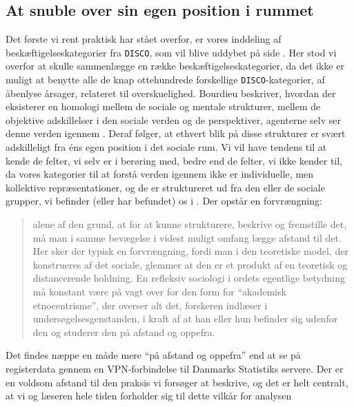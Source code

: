 \subsection{At snuble over sin egen position i rummet}

Det første vi rent praktisk har stået overfor, er vores inddeling af beskæftigelseskategorier fra \texttt{DISCO}, som vil blive uddybet på side \pageref{disco_omkodninger}. Her stod vi overfor at skulle sammenlægge en række beskæftigelseskategorier, da det ikke er muligt at benytte alle de knap ottehundrede forskellige \texttt{DISCO}-kategorier, af åbenlyse årsager, relateret til overskuelighed. Bourdieu beskriver, hvordan der eksisterer en homologi mellem de sociale og mentale strukturer, mellem de objektive adskillelser i den sociale verden og de perspektiver, agenterne selv ser denne verden igennem \parencite[12]{Bourdieu1992}. Deraf følger, at ethvert blik på disse strukturer er svært adskilleligt fra éns egen position i det sociale rum. Vi vil have tendens til at kende de felter, vi selv er i berøring med, bedre end de felter, vi ikke kender til, da vores kategorier til at forstå verden igennem ikke er individuelle, men kollektive repræsentationer, og de er struktureret ud fra den eller de sociale grupper, vi befinder (eller har befundet) os i \parencite[12]{Bourdieu1992}. Der opstår en forvrængning:
%
\begin{quote} \small %
alene af den grund, at for at kunne strukturere, beskrive og fremstille det, må man i samme bevægelse i videst muligt omfang lægge afstand til det. Her sker der typisk en forvrængning, fordi man i den teoretiske model, der konstrueres af det sociale, glemmer at den er et produkt af en teoretisk og distancerende holdning. En refleksiv sociologi i ordets egentlige betydning må konstant være på vagt over for den form for “akademisk etnocentrisme”, der overser alt det, forskeren indlæser i undersøgelsesgenstanden, i kraft af at han eller hun befinder sig udenfor den og studerer den på afstand og oppefra. 
\end{quote}
%
Det findes næppe en måde mere “på afstand og oppefra” end at se på registerdata gennem en VPN-forbindelse til Danmarks Statistiks servere. Der er en voldsom afstand til den praksis vi forsøger at beskrive, og det er helt centralt, at vi og læseren hele tiden forholder sig til dette vilkår for analysen%
%
